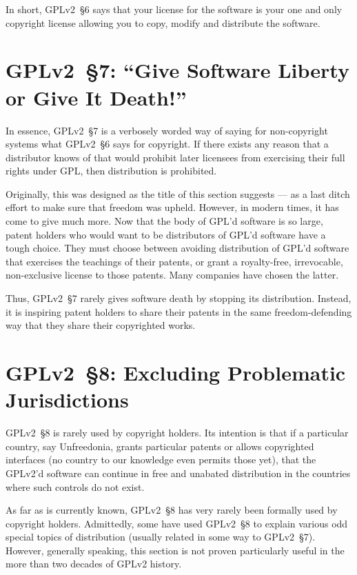 In short, GPLv2~\S6 says that your license for the software is your one and
only copyright license allowing you to copy, modify and distribute the
software.

\section{GPLv2~\S7: ``Give Software Liberty or Give It Death!''}
\label{GPLv2s7}

In essence, GPLv2~\S7 is a verbosely worded way of saying for non-copyright
systems what GPLv2~\S6 says for copyright.  If there exists any reason that a
distributor knows of that would prohibit later licensees from exercising
their full rights under GPL, then distribution is prohibited.

Originally, this was designed as the title of this section suggests --- as
a last ditch effort to make sure that freedom was upheld.  However, in
modern times, it has come to give much more.  Now that the body of GPL'd
software is so large, patent holders who would want to be distributors of
GPL'd software have a tough choice.  They must choose between avoiding
distribution of GPL'd software that exercises the teachings of their
patents, or grant a royalty-free, irrevocable, non-exclusive license to
those patents.  Many companies have chosen the latter.

Thus, GPLv2~\S7 rarely gives software death by stopping its distribution.
Instead, it is inspiring patent holders to share their patents in the same
freedom-defending way that they share their copyrighted works.

\section{GPLv2~\S8: Excluding Problematic Jurisdictions}
\label{GPLv2s8}

GPLv2~\S8 is rarely used by copyright holders.  Its intention is that if a
particular country, say Unfreedonia, grants particular patents or allows
copyrighted interfaces (no country to our knowledge even permits those
yet), that the GPLv2'd software can continue in free and unabated
distribution in the countries where such controls do not exist.

As far as is currently known, GPLv2~\S8 has very rarely been formally used by
copyright holders.  Admittedly, some have used GPLv2~\S8 to explain various
odd special topics of distribution (usually related in some way to
GPLv2~\S7).  However, generally speaking, this section is not proven
particularly useful in the more than two decades of GPLv2 history.

